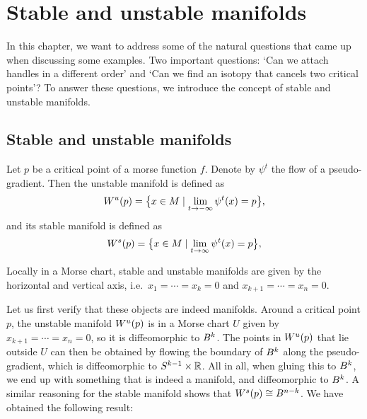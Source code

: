 \chapter{Stable and unstable manifolds}


In this chapter, we want to address some of the natural questions that came up when discussing some examples.
Two important questions: `Can we attach handles in a different order' and `Can we find an isotopy that cancels two critical points'?
To answer these questions, we introduce the concept of stable and unstable manifolds.

\section{Stable and unstable manifolds}


\begin{definition}
    Let $p$ be a critical point of a morse function $f$.
    Denote by $\psi^{t}$ the flow of a pseudo-gradient.
    Then the unstable manifold is defined as
    \[
        W^u(p) = \big\{x \in M  \mid  \lim_{t \to -\infty} \psi^{t} (x)  = p\big\} 
    ,\] 
    and its stable manifold is defined as
    \[
        W^s(p) = \big\{x \in M  \mid  \lim_{t \to \infty} \psi^{t} (x)  = p\big\} 
    ,\] 
\end{definition}
\begin{marginfigure}
    \centering
    \caption{Locally in a Morse chart, stable and unstable manifolds are given by the horizontal and vertical axis, i.e.\ $ x_1= \cdots= x_k = 0$ and $x_{k+1}= \cdots= x_n = 0$.}
    \label{fig:stable-and-unstable-manifolds-are-manifiolds}
\end{marginfigure}
Let us first verify that these objects are indeed manifolds. 
Around a critical point $p$, the unstable manifold $W^u(p)$ is in a Morse chart $U$ given by $x_{k+1} = \cdots = x_n = 0$, so it is diffeomorphic to $B^{k}$.
The points in $W^u(p)$ that lie outside $U$ can then be obtained by flowing the boundary of $B^{k}$ along the pseudo-gradient, which is diffeomorphic to $S^{k-1} \times \mathbb{R}$. All in all, when gluing this to $B^{k}$, we end up with something that is indeed a manifold, and diffeomorphic to $B^{k}$.
A similar reasoning for the stable manifold shows that $W^s(p) \cong B^{n - k}$.
We have obtained the following result:

